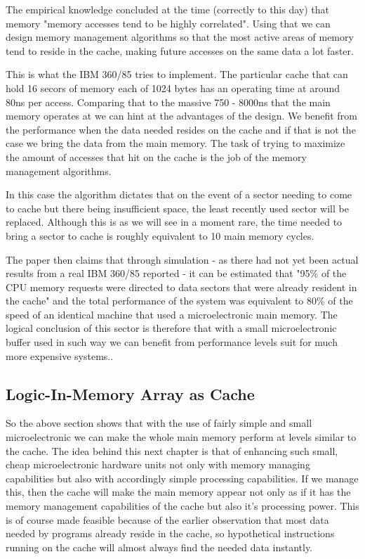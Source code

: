 \documentclass[12pt,twocolumn]{IEEEtran}
\begin{document}
The empirical knowledge concluded at the time (correctly to this day) that memory "memory accesses tend to be highly correlated". Using that we can design memory management algorithms so that the most active areas of memory tend to reside in the cache, making future accesses on the same data a lot faster. 

This is what the IBM 360/85 tries to implement. The particular cache that can hold 16 secors of memory each of 1024 bytes has an operating time at around 80ns per access. Comparing that to the massive 750 - 8000ns that the main memory operates at we can hint at the advantages of the design. We benefit from the performance when the data needed resides on the cache and if that is not the case we bring the data from the main memory. The task of trying to maximize the amount of accesses that hit on the cache is the job of the memory management algorithms.

In this case the algorithm dictates that on the event of a sector needing to come to cache but there being insufficient space, the least recently used sector will be replaced. Although this is as we will see in a moment rare, the time needed to bring a sector to cache is roughly equivalent to 10 main memory cycles.

The paper then claims that through simulation - as there had not yet been actual results from a real IBM 360/85 reported - it can be estimated that "95\% of the CPU memory requests were directed to data sectors that were already resident in the cache" and the total performance of the system was equivalent to 80\% of the speed of an identical machine that used a microelectronic main memory.  The logical conclusion of this sector is therefore that with a small microelectronic buffer used in such way we can benefit from performance levels suit for much more expensive systems.\cite{PAPER:2}. 

\subsection{Logic-In-Memory Array as Cache}
So the above section shows that with the use of fairly simple and small microelectronic we can make the whole main memory perform at levels similar to the cache. The idea behind this next chapter is that of enhancing such small, cheap microelectronic hardware units not only with memory managing capabilities but also with accordingly simple processing capabilities. If we manage this, then the cache will make the main memory appear not only as if it has the memory management capabilities of the cache but also it's processing power. This is of course made feasible because of the earlier observation that most data needed by programs already reside in the cache, so hypothetical instructions running on the cache will almost always find the needed data instantly.
\end{document}
